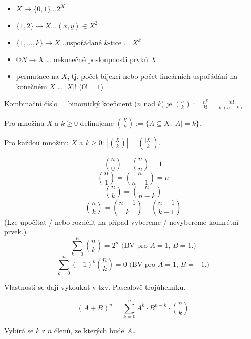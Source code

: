 \documentclass[12pt]{article}					%
\begin{document}
    \begin{poznamka}
        \ 
        \begin{itemize}
            \item $X \rightarrow \{0, 1\} … 2^X$
            \item $\{1, 2\} \rightarrow X … (x, y)\in X^2$
            \item $\{1, …, k\} \rightarrow X … \text{uspořádané $k$-tice … $X^k$}$
            \item $®N \rightarrow X$ … nekonečné posloupnosti prvků $X$
            \item permutace na $X$, tj. počet bijekcí nebo počet lineárních uspořádání na konečném $X$ … $|X|!$ ($0!=1$)
        \end{itemize}
    \end{poznamka}

    \begin{definice}
        Kombinační číslo = binomický koeficient ($n$ nad $k$) je $\binom{n}{k} := \frac{n^{\underline{k}}}{k!} = \frac{n!}{k!(n-k)!}$.
    \end{definice}

    \begin{definice}
        Pro množinu $X$ a $k≥0$ definujeme $\binom{X}{k}:= \{A \subseteq X: |A| = k\}$.
    \end{definice}

    \begin{veta}
        Pro každou množinu $X$ a $k≥0$: $\left|\binom{X}{k}\right| = \binom{|X|}{k}$.
    \end{veta}

    \begin{poznamka}
        $$ \binom{n}{0} = \binom{n}{n} = 1 $$ 
        $$ \binom{n}{1} = \binom{n}{n-1} = n $$ 
        $$ \binom{n}{k} = \binom{n}{n-k} $$
        $$ \binom{n}{k} = \binom{n-1}{k} + \binom{n-1}{k-1} $$
        \hfill(Lze upočítat / nebo rozdělit na případ vybereme / nevybereme konkrétní prvek.)\hfill\ 
        $$ \sum_{k=0}^n \binom{n}{k} = 2^n \text{ (BV pro $A=1$, $B=1$.)} $$ 
        $$ \sum_{k=0}^n (-1)^k \binom{n}{k} = 0 \text{ (BV pro $A=1$, $B=-1$.)} $$
    \end{poznamka}

    \begin{poznamka}
        Vlastnosti se dají vykoukat v tzv. Pascalově trojúhelníku.
    \end{poznamka}

    \begin{veta}[Binomická]
        $$ (A + B)^n = \sum_{k=0}^n A^k·B^{n-k}·\binom{n}{k} $$

        \begin{dukazin}
            Vybírá se $k$ z $n$ členů, ze kterých bude $A$…
        \end{dukazin}
    \end{veta}
\end{document}
